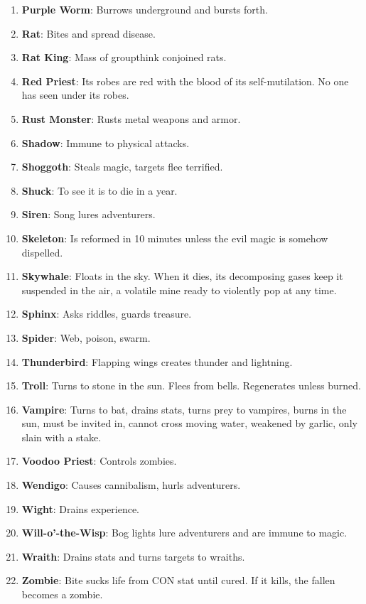 \documentclass[twoside]{article}
\begin{document}
\begin{enumerate}[nosep]
\item \textbf{Purple Worm}: Burrows underground and bursts forth.
\item \textbf{Rat}: Bites and spread disease.
\item \textbf{Rat King}: Mass of groupthink conjoined rats.
\item \textbf{Red Priest}: Its robes are red with the blood of its self-mutilation. No one has seen under its robes.
\item \textbf{Rust Monster}: Rusts metal weapons and armor.
\item \textbf{Shadow}: Immune to physical attacks.
\item \textbf{Shoggoth}: Steals magic, targets flee terrified.
\item \textbf{Shuck}: To see it is to die in a year.
\item \textbf{Siren}: Song lures adventurers.
\item \textbf{Skeleton}: Is reformed in 10 minutes unless the evil magic is somehow dispelled.
\item \textbf{Skywhale}: Floats in the sky. When it dies, its decomposing gases keep it suspended in the air, a volatile mine ready to violently pop at any time.
\item \textbf{Sphinx}: Asks riddles, guards treasure.
\item \textbf{Spider}: Web, poison, swarm.
\item \textbf{Thunderbird}: Flapping wings creates thunder and lightning.
\item \textbf{Troll}: Turns to stone in the sun. Flees from bells. Regenerates unless burned.
\item \textbf{Vampire}: Turns to bat, drains stats, turns prey to vampires, burns in the sun, must be invited in, cannot cross moving water, weakened by garlic, only slain with a stake.
\item \textbf{Voodoo Priest}: Controls zombies.
\item \textbf{Wendigo}: Causes cannibalism, hurls adventurers.
\item \textbf{Wight}: Drains experience.
\item \textbf{Will-o'-the-Wisp}: Bog lights lure adventurers and are immune to magic.
\item \textbf{Wraith}: Drains stats and turns targets to wraiths.
\item \textbf{Zombie}: Bite sucks life from CON stat until cured. If it kills, the fallen becomes a zombie.
\label{mon:num}
\end{enumerate}
\end{document}
